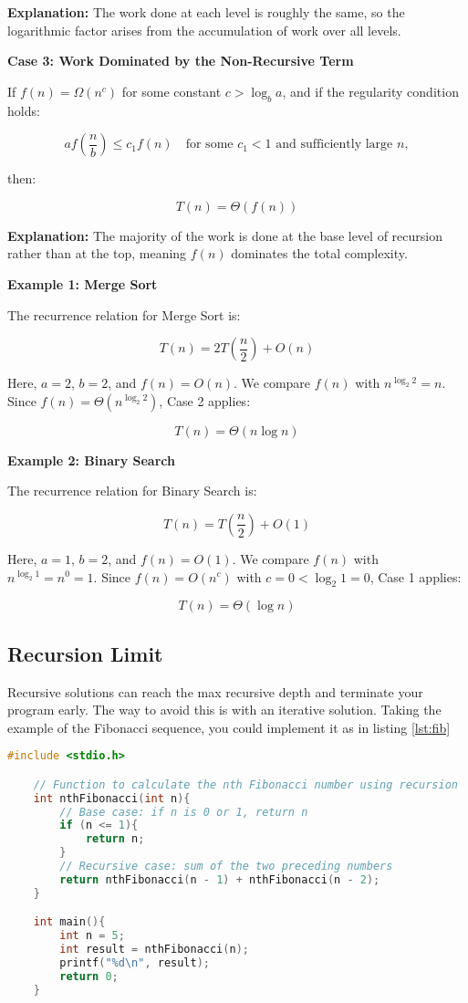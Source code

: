 \textbf{Explanation:} The work done at each level is roughly the same, so the logarithmic factor arises from the accumulation of work over all levels.

\textbf{Case 3: Work Dominated by the Non-Recursive Term}

If \( f(n) = \Omega(n^c) \) for some constant \( c > \log_b a \), and if the regularity condition holds:

\[
    a f\left(\frac{n}{b}\right) \leq c_1 f(n) \quad \text{for some } c_1 < 1 \text{ and sufficiently large } n,
\]

then:

\[
    T(n) = \Theta(f(n))
\]

\textbf{Explanation:} The majority of the work is done at the base
level of recursion rather than at the top, meaning \( f(n) \)
dominates the total complexity.

\textbf{Example 1: Merge Sort}

The recurrence relation for Merge Sort is:

\[
    T(n) = 2T\left(\frac{n}{2}\right) + O(n)
\]

Here, \( a = 2 \), \( b = 2 \), and \( f(n) = O(n) \). We compare \( f(n) \) with \( n^{\log_2 2} = n \). Since \( f(n) = \Theta(n^{\log_2 2}) \), Case 2 applies:

\[
    T(n) = \Theta(n \log n)
\]

\textbf{Example 2: Binary Search}

The recurrence relation for Binary Search is:

\[
    T(n) = T\left(\frac{n}{2}\right) + O(1)
\]

Here, \( a = 1 \), \( b = 2 \), and \( f(n) = O(1) \). We compare \( f(n) \) with \( n^{\log_2 1} = n^0 = 1 \). Since \( f(n) = O(n^c) \) with \( c = 0 < \log_2 1 = 0 \), Case 1 applies:

\[
    T(n) = \Theta(\log n)
\]

\subsection{Recursion Limit}

Recursive solutions can reach the max recursive depth and
terminate your program early. The way to avoid this is with
an iterative solution. Taking the example of the Fibonacci
sequence, you could implement it as in listing \ref{lst:fib}

\begin{lstlisting}[language=C, label={lst:fib}, caption=Singly Linked List Node Structure]
    #include <stdio.h>

    // Function to calculate the nth Fibonacci number using recursion
    int nthFibonacci(int n){
        // Base case: if n is 0 or 1, return n
        if (n <= 1){
            return n;
        }
        // Recursive case: sum of the two preceding numbers
        return nthFibonacci(n - 1) + nthFibonacci(n - 2);
    }

    int main(){
        int n = 5;
        int result = nthFibonacci(n);
        printf("%d\n", result);
        return 0;
    }
\end{lstlisting}


